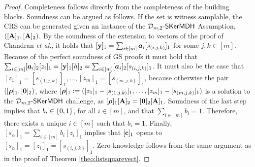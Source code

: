 \begin{proof} Completeness follows directly from the completeness of the 
building blocks.  Soundness can be argued as follows. If the set is witness samplable, the CRS can be generated given an instance of the $\mathcal{D}_{m,2}\mbox{-}\mathsf{SKerMDH}$ Assumption, $([\mathbf{{A}}]_1, [\mathbf{{A}}]_2)$. By the soundness of the extension to vectors of the proof of Chandran \textit{et al.}, it holds that $[\mathbf{y}]_1 = \sum_{i\in[m]}{\boldsymbol a}_i[s_{(i,j,k)}]_1$ for some $j,k\in[m]$.
Because of the perfect soundness of GS proofs it must hold that $\sum_{i\in[m]}[{\boldsymbol a}_i]_2[z_i]_1=[\mathbf{y}]_1[h]_2=\sum_{i\in[m]}[{\boldsymbol a}_i]_2[s_{(i,j,k)}]_1$. It must also be the case that $[z_1]_1=[s_{(1,j,k)}]_1,\allowbreak\ldots,[z_m]_1=[s_{(m,j,k)}]_1$, because otherwise the pair $([{\boldsymbol \rho}]_1,[{\boldsymbol 0}]_2)$, where 
$[{\boldsymbol \rho}]_1:=([z_1]_1-[s_{(1,j,k)}]_1,\allowbreak\ldots,[z_m]_1-[s_{(m,j,k)}]_1)$ is a solution to the $\mathcal{D}_{m,2}\mbox{-}\mathsf{SKerMDH}$ challenge, as $[{\boldsymbol \rho}]_1[\mathbf{{A}}]_2=[{\boldsymbol 0}]_2[\mathbf{{A}}]_1$. Soundness of the last step implies that $b_i\in\{0,1\}$, for all $i\in[m]$, and that $\sum_{i\in[m]} b_i=1$. Therefore, there exists a unique $i\in[m]$ such that $b_i=1$. Finally, $[s_{\alpha}]_1=\sum_{i\in[m]}b_i[z_i]_1$ implies that $[\mathbf{c}]_1$ opens to $[s_{\alpha}]_1=[z_i]_1=[s_{(i,j,k)}]_1$.
Zero-knowledge follows from the same argument as in the proof of Theorem \ref{theo:listsquarevect}.
\end{proof} 

